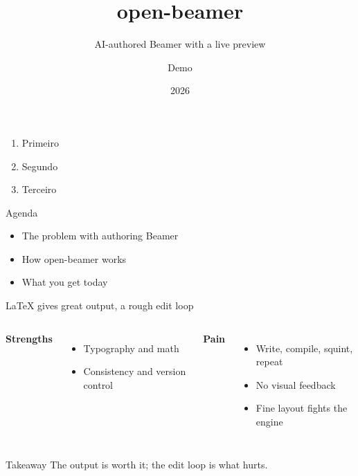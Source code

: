 \documentclass[aspectratio=169]{beamer}
\title{open-beamer}
\subtitle{AI-authored Beamer with a live preview}
\author{Demo}
\date{2026}
\begin{document}
	\begin{frame}[plain]
		\titlepage

		\begin{enumerate}
			\item Primeiro

			\item Segundo

			\item Terceiro
		\end{enumerate}
	\end{frame}

	\begin{frame}{Agenda}
		\begin{itemize}
			\item The problem with authoring Beamer

			\item How open-beamer works

			\item What you get today
		\end{itemize}
	\end{frame}

	\begin{frame}{LaTeX gives great output, a rough edit loop}
		\begin{columns}[T, onlytextwidth]
			\textbf{Strengths}
			\begin{itemize}
				\item Typography and math

				\item Consistency and version control
			\end{itemize}
			\textbf{Pain}
			\begin{itemize}
				\item Write, compile, squint, repeat

				\item No visual feedback

				\item Fine layout fights the engine
			\end{itemize}
		\end{columns}
		\vspace{4mm}
		\begin{block}{Takeaway}
			The output is worth it; the edit loop is what hurts.
		\end{block}
	\end{frame}
\end{document}
